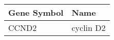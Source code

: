 \begin{tabular}{ll}
\toprule
Gene Symbol &      Name \\
\midrule
      CCND2 & cyclin D2 \\
\bottomrule
\end{tabular}
